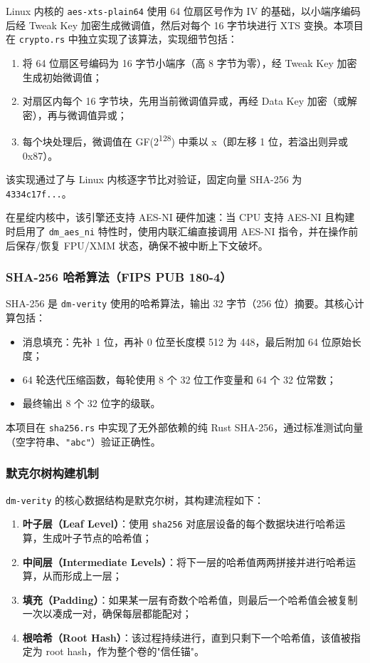 Linux 内核的 \texttt{aes-xts-plain64} 使用 64 位扇区号作为 IV 的基础，以小端序编码后经 Tweak Key 加密生成微调值，然后对每个 16 字节块进行 XTS 变换。本项目在 \texttt{crypto.rs} 中独立实现了该算法，实现细节包括：

\begin{enumerate}
    \item 将 64 位扇区号编码为 16 字节小端序（高 8 字节为零），经 Tweak Key 加密生成初始微调值；
    \item 对扇区内每个 16 字节块，先用当前微调值异或，再经 Data Key 加密（或解密），再与微调值异或；
    \item 每个块处理后，微调值在 GF(2\textsuperscript{128}) 中乘以 x（即左移 1 位，若溢出则异或 0x87）。
\end{enumerate}

该实现通过了与 Linux 内核逐字节比对验证，固定向量 SHA-256 为 \texttt{4334c17f...}。

在星绽内核中，该引擎还支持 AES-NI 硬件加速：当 CPU 支持 AES-NI 且构建时启用了 \texttt{dm\_aes\_ni} 特性时，使用内联汇编直接调用 AES-NI 指令，并在操作前后保存/恢复 FPU/XMM 状态，确保不被中断上下文破坏。

\subsubsection{SHA-256 哈希算法（FIPS PUB 180-4）}

SHA-256 是 \texttt{dm-verity} 使用的哈希算法，输出 32 字节（256 位）摘要。其核心计算包括：

\begin{itemize}
    \item 消息填充：先补 1 位，再补 0 位至长度模 512 为 448，最后附加 64 位原始长度；
    \item 64 轮迭代压缩函数，每轮使用 8 个 32 位工作变量和 64 个 32 位常数；
    \item 最终输出 8 个 32 位字的级联。
\end{itemize}

本项目在 \texttt{sha256.rs} 中实现了无外部依赖的纯 Rust SHA-256，通过标准测试向量（空字符串、\texttt{"abc"}）验证正确性。

\subsubsection{默克尔树构建机制}

\texttt{dm-verity} 的核心数据结构是默克尔树，其构建流程如下：

\begin{enumerate}
    \item \textbf{叶子层（Leaf Level）}：使用 \texttt{sha256} 对底层设备的每个数据块进行哈希运算，生成叶子节点的哈希值；
    \item \textbf{中间层（Intermediate Levels）}：将下一层的哈希值两两拼接并进行哈希运算，从而形成上一层；
    \item \textbf{填充（Padding）}：如果某一层有奇数个哈希值，则最后一个哈希值会被复制一次以凑成一对，确保每层都能配对；
    \item \textbf{根哈希（Root Hash）}：该过程持续进行，直到只剩下一个哈希值，该值被指定为 root hash，作为整个卷的"信任锚"。
\end{enumerate}

